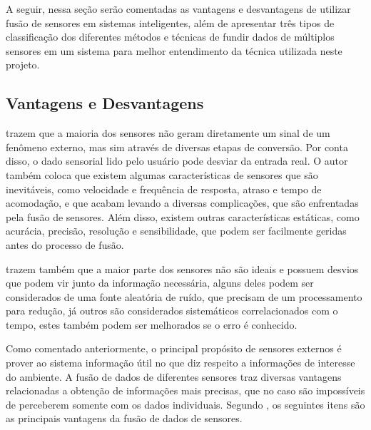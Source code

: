 \documentclass[acronym, symbols, table, deposito]{fei}
\begin{document}
		A seguir, nessa seção serão comentadas as vantagens e desvantagens de utilizar fusão de sensores em sistemas inteligentes, além de apresentar três tipos de classificação dos diferentes métodos e técnicas de fundir dados de múltiplos sensores em um sistema para melhor entendimento da técnica utilizada neste projeto.
		
		\subsection{Vantagens e Desvantagens}
		
			\textcite{fung2017sensor} trazem que a maioria dos sensores não geram diretamente um sinal de um fenômeno externo, mas sim através de diversas etapas de conversão. Por conta disso, o dado sensorial lido pelo usuário pode desviar da entrada real. O autor também coloca que existem algumas características de sensores que são inevitáveis, como velocidade e frequência de resposta, atraso e tempo de acomodação, e que acabam levando a diversas complicações, que são enfrentadas pela fusão de sensores. Além disso, existem outras características estáticas, como acurácia, precisão, resolução e sensibilidade, que podem ser facilmente geridas antes do processo de fusão.
			
			\textcite{fung2017sensor} trazem também que a maior parte dos sensores não são ideais e possuem desvios que podem vir junto da informação necessária, alguns deles podem ser considerados de uma fonte aleatória de ruído, que precisam de um processamento para redução, já outros são considerados sistemáticos correlacionados com o tempo, estes também podem ser melhorados se o erro é conhecido.
			
			Como comentado anteriormente, o principal propósito de sensores externos é prover ao sistema informação útil no que diz respeito a informações de interesse do ambiente. A fusão de dados de diferentes sensores traz diversas vantagens relacionadas a obtenção de informações mais precisas, que no caso são impossíveis de perceberem somente com os dados individuais. Segundo \textcite{alatise2020review}, os seguintes itens são as principais vantagens da fusão de dados de sensores.
			
\end{document}
